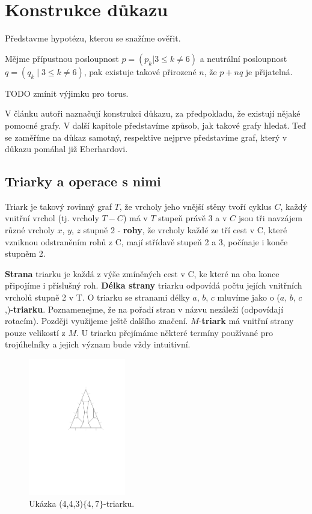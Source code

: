 
\chapter{Konstrukce důkazu}

Představme hypotézu, kterou se snažíme ověřit.
\begin{hypot}\label{veta02:hypoteza}
Mějme přípustnou posloupnost $p=(p_k | 3 \leq k \neq 6)$ a neutrální posloupnost $q=(q_k \mid 3 \leq k \neq 6)$, pak existuje takové přirozené $n$, že $p+nq$ je přijatelná.
\end{hypot}

TODO zmínit výjimku pro torus.

V článku \citep{Samal09} autoři naznačují konstrukci důkazu, za předpokladu, že existují nějaké pomocné grafy. V další kapitole představíme způsob, jak takové grafy hledat. Teď se zaměříme na důkaz samotný, respektive nejprve představíme graf, který v důkazu pomáhal již Eberhardovi.

\section{Triarky a operace s nimi}

\begin{definice}[Triark]\label{def02:1}
Triark je takový rovinný graf $T$, že vrcholy jeho vnější stěny tvoří cyklus $C$, každý vnitřní vrchol (tj. vrcholy $T-C$) má v $T$ stupeň právě 3 a v $C$ jsou tři navzájem různé vrcholy $x$, $y$, $z$ stupně 2 - \textbf{rohy}, že vrcholy každé ze tří cest v C, které vzniknou odstraněním rohů z C, mají střídavě stupeň 2 a 3, počínaje i konče stupněm 2.
\end{definice}

\textbf{Strana} triarku je každá z výše zmíněných cest v C, ke které na oba konce připojíme i příslušný roh. \textbf{Délka strany} triarku odpovídá počtu jejích vnitřních vrcholů stupně 2 v T. O triarku se stranami délky $a$, $b$, $c$ mluvíme jako o ($a$, $b$, $c$,)-\textbf{triarku}. Poznamenejme, že na pořadí stran v názvu nezáleží (odpovídají rotacím). Později využijeme ještě dalšího značení. $M$-\textbf{triark} má vnitřní strany pouze velikostí z $M$. U triarku přejímáme některé termíny používané pro trojúhelníky a jejich význam bude vždy intuitivní.

\begin{figure}[h!]\centering
\includegraphics[height=60mm]{../img/triarc}
\caption{Ukázka (4,4,3)$ \lbrace 4,7\rbrace $-triarku.}
\label{obr03:triark}
\end{figure}

